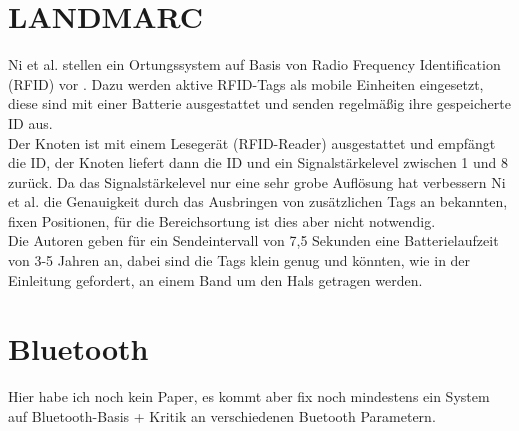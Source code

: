 \section{LANDMARC}
\label{ch:Vorherige:sec:LANDMARC}
Ni et al. stellen ein Ortungssystem auf Basis von Radio Frequency Identification (RFID) vor \cite{ni2004landmarc}.
Dazu werden aktive RFID-Tags als mobile Einheiten eingesetzt, diese sind mit einer Batterie ausgestattet und senden regelmäßig ihre gespeicherte ID aus.\\
Der Knoten ist mit einem Lesegerät (RFID-Reader) ausgestattet und empfängt die ID, der Knoten liefert dann die ID und ein Signalstärkelevel zwischen 1 und 8 zurück. 
Da das Signalstärkelevel nur eine sehr grobe Auflösung hat verbessern Ni et al. die Genauigkeit durch das Ausbringen von zusätzlichen Tags an bekannten, fixen Positionen, für die Bereichsortung ist dies aber nicht notwendig.\\
Die Autoren geben für ein Sendeintervall von 7,5 Sekunden eine Batterielaufzeit von 3-5 Jahren an, dabei sind die Tags klein genug und könnten, wie in der Einleitung gefordert, an einem Band um den Hals getragen werden.

\section{Bluetooth}
\label{ch:Vorherige:sec:Bluetooth}
Hier habe ich noch kein Paper, es kommt aber fix noch mindestens ein System auf Bluetooth-Basis + Kritik an verschiedenen Buetooth Parametern.


